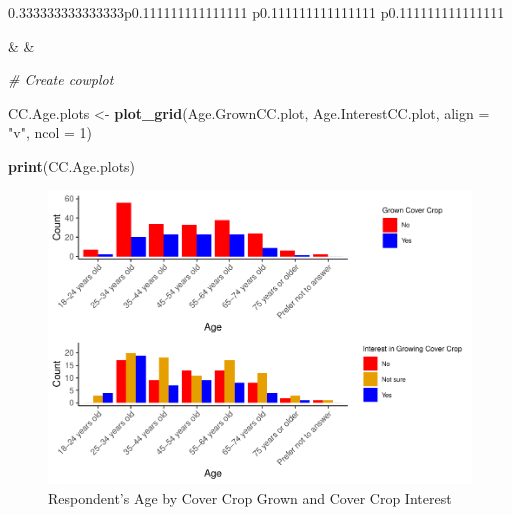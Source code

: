 \documentclass[12pt,]{article}
\newenvironment{Shaded}{\begin{snugshade}}{\end{snugshade}}
\newcommand{\KeywordTok}[1]{\textcolor[rgb]{0.13,0.29,0.53}{\textbf{#1}}}
\newcommand{\DataTypeTok}[1]{\textcolor[rgb]{0.13,0.29,0.53}{#1}}
\newcommand{\DecValTok}[1]{\textcolor[rgb]{0.00,0.00,0.81}{#1}}
\newcommand{\StringTok}[1]{\textcolor[rgb]{0.31,0.60,0.02}{#1}}
\newcommand{\CommentTok}[1]{\textcolor[rgb]{0.56,0.35,0.01}{\textit{#1}}}
\newcommand{\NormalTok}[1]{#1}
\begin{document}
\begin{table}[h]
\begin{raggedright}
\begin{threeparttable}
\begin{tabularx}{0.333333333333333\textwidth}{p{} p{} p{}}

 &
 &
 \tabularnewline[-0.5pt]


\end{tabularx}\end{threeparttable}
\par\end{raggedright}

\end{table}

\begin{Shaded}
\begin{Highlighting}[]
\CommentTok{# Create cowplot}

\NormalTok{CC.Age.plots <-}\StringTok{ }\KeywordTok{plot_grid}\NormalTok{(Age.GrownCC.plot, Age.InterestCC.plot, }
                          \DataTypeTok{align =} \StringTok{"v"}\NormalTok{, }\DataTypeTok{ncol =} \DecValTok{1}\NormalTok{)}

\KeywordTok{print}\NormalTok{(CC.Age.plots) }
\end{Highlighting}
\end{Shaded}

\begin{figure}
\includegraphics[width=0.9\linewidth]{Project_Template_files/figure-latex/combined age graphs-1} \caption{Respondent's Age by Cover Crop Grown and Cover Crop Interest}\label{fig:combined age graphs}
\end{figure}
\end{document}
